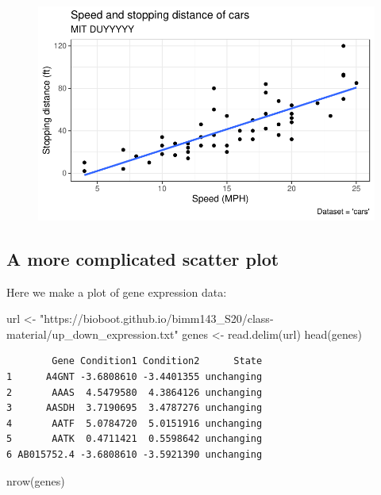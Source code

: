 \documentclass[
  letterpaper,
  DIV=11,
  numbers=noendperiod]{scrartcl}
\newenvironment{Shaded}{\begin{snugshade}}{\end{snugshade}}
\newcommand{\FunctionTok}[1]{\textcolor[rgb]{0.28,0.35,0.67}{#1}}
\newcommand{\NormalTok}[1]{\textcolor[rgb]{0.00,0.23,0.31}{#1}}
\newcommand{\OtherTok}[1]{\textcolor[rgb]{0.00,0.23,0.31}{#1}}
\newcommand{\StringTok}[1]{\textcolor[rgb]{0.13,0.47,0.30}{#1}}
\begin{document}
\begin{figure}[H]

{\centering \includegraphics{class05_files/figure-pdf/unnamed-chunk-7-1.pdf}

}

\end{figure}

\hypertarget{a-more-complicated-scatter-plot}{%
\subsection{A more complicated scatter
plot}\label{a-more-complicated-scatter-plot}}

Here we make a plot of gene expression data:

\begin{Shaded}
\begin{Highlighting}[]
\NormalTok{url }\OtherTok{\textless{}{-}} \StringTok{"https://bioboot.github.io/bimm143\_S20/class{-}material/up\_down\_expression.txt"}
\NormalTok{genes }\OtherTok{\textless{}{-}} \FunctionTok{read.delim}\NormalTok{(url)}
\FunctionTok{head}\NormalTok{(genes)}
\end{Highlighting}
\end{Shaded}

\begin{verbatim}
        Gene Condition1 Condition2      State
1      A4GNT -3.6808610 -3.4401355 unchanging
2       AAAS  4.5479580  4.3864126 unchanging
3      AASDH  3.7190695  3.4787276 unchanging
4       AATF  5.0784720  5.0151916 unchanging
5       AATK  0.4711421  0.5598642 unchanging
6 AB015752.4 -3.6808610 -3.5921390 unchanging
\end{verbatim}

\begin{Shaded}
\begin{Highlighting}[]
\FunctionTok{nrow}\NormalTok{(genes)}
\end{Highlighting}
\end{Shaded}
\end{document}
